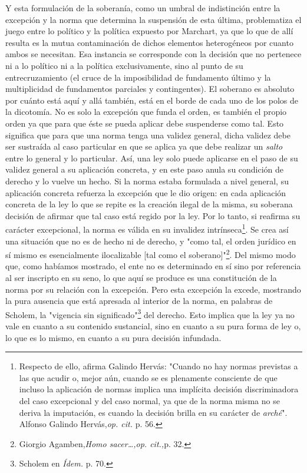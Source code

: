 Y esta formulación de la soberanía, como un umbral de indistinción entre
la excepción y la norma que determina la suspensión de esta última,
problematiza el juego entre lo político y la política expuesto por
Marchart, ya que lo que de allí resulta es la mutua contaminación de
dichos elementos heterogéneos por cuanto ambos se necesitan. Esa
instancia se corresponde con la decisión que no pertenece ni a lo
político ni a la política exclusivamente, sino al punto de su
entrecruzamiento (el cruce de la imposibilidad de fundamento último y la
multiplicidad de fundamentos parciales y contingentes). El soberano es
absoluto por cuánto está aquí y allá también, está en el borde de cada
uno de los polos de la dicotomía. No es solo la excepción que funda el
orden, es también el propio orden ya que para que éste se pueda aplicar
debe suspenderse como tal. Esto significa que para que una norma tenga
una validez general, dicha validez debe ser sustraída al caso particular
en que se aplica ya que debe realizar un \emph{salto} entre lo general y
lo particular. Así, una ley solo puede aplicarse en el paso de su
validez general a su aplicación concreta, y en este paso anula su
condición de derecho y lo vuelve un hecho. Si la norma estaba formulada
a nivel general, su aplicación concreta refuerza la excepción que le dio
origen: en cada aplicación concreta de la ley lo que se repite es la
creación ilegal de la misma, su soberana decisión de afirmar que tal
caso está regido por la ley. Por lo tanto, si reafirma su carácter
excepcional, la norma es válida en su invalidez intrínseca\footnote{Respecto
  de ello, afirma Galindo Hervás: "Cuando no hay normas previstas a las
  que acudir o, mejor aún, cuando se es plenamente consciente de que
  incluso la aplicación de normas implica una implícita decisión
  discriminadora del caso excepcional y del caso normal, ya que de la
  norma misma no se deriva la imputación, es cuando la decisión brilla
  en su carácter de \emph{arché}". Alfonso Galindo Hervás,\emph{op.
  cit.} p. 56.}. Se crea así una situación que no es de hecho ni de
derecho, y "como tal, el orden jurídico en sí mismo es esencialmente
ilocalizable {[}tal como el soberano{]}"\footnote{Giorgio
  Agamben,\emph{Homo sacer\ldots,op. cit.,}p. 32.}. Del mismo modo que,
como habíamos mostrado, el ente no es determinado en sí sino por
referencia al ser inscripto en su seno, lo que aquí se produce es una
constitución de la norma por su relación con la excepción. Pero esta
excepción la excede, mostrando la pura ausencia que está apresada al
interior de la norma, en palabras de Scholem, la "vigencia sin
significado"\footnote{Scholem en \emph{Ídem.} p. 70.} del derecho. Esto
implica que la ley ya no vale en cuanto a su contenido sustancial, sino
en cuanto a su pura forma de ley o, lo que es lo mismo, en cuanto a su
pura decisión infundada.


